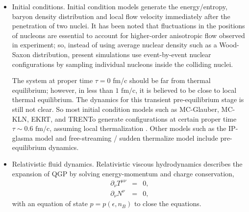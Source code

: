 \documentclass[aps,prl,twocolumn,groupedaddress]{revtex4-1}
\begin{document}
	\begin{itemize}
		\item Initial conditions. 		
		Initial condition models generate the energy/entropy, baryon density distribution and local flow velocity immediately after the penetration of two nuclei.
		It has been noted that fluctuations in the positions of nucleons are essential to account for higher-order anisotropic flow observed in experiment;
		so, instead of using average nuclear density such as a Wood-Saxon distribution, present simulations use event-by-event nuclear configurations by sampling individual nucleons inside the colliding nuclei.
		
		The system at proper time $\tau = 0$ fm/c should be far from thermal equilibrium; however, in less than $1 \textrm{ fm/c}$, it is believed to be close to local thermal equilibrium.
		The dynamics for this transient pre-equilibrium stage is still not clear.
		So most initial condition models such as MC-Glauber, MC-KLN, EKRT, and TRENTo generate configurations at certain proper time $\tau\sim 0.6 \textrm{ fm/c}$, assuming local thermalization \citep{Miller:2007ri, Drescher:2006ca, Eskola:1999fc, Moreland:2014oya}.
		Other models such as the IP-glasma model \citep{Schenke:2012wb} and free-streaming / sudden thermalize model \citep{Liu:2015nwa} include pre-equilibrium dynamics.
		
		\item Relativistic fluid dynamics. 
		Relativistic viscous hydrodynamics describes the expansion of QGP by solving energy-momentum and charge conservation,
		\begin{eqnarray}
			\partial_\nu T^{\mu\nu} &=& 0, \\
			\partial_\nu N^{\nu} &=& 0,
		\end{eqnarray}
		with an equation of state $p = p(\epsilon, n_B)$ to close the equations. 
		

\end{itemize}
\end{document}

